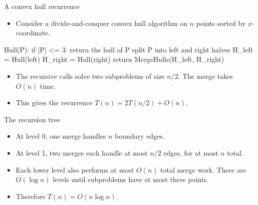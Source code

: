 \documentclass[aspectratio=169]{beamer}
\begin{document}
\begin{frame}[fragile]{A convex hull recurrence}
\begin{itemize}
\item Consider a divide-and-conquer convex hull algorithm on $n$ points sorted by $x$-coordinate.
\end{itemize}
\pause
\begin{pycode}
Hull(P):
    if |P| <= 3: return the hull of P
    split P into left and right halves
    H_left  = Hull(left)
    H_right = Hull(right)
    return MergeHulls(H_left, H_right)
\end{pycode}
\pause
\begin{itemize}[<+->]
\item The recursive calls solve two subproblems of size $n/2$. The merge takes $O(n)$ time.
\item This gives the recurrence $T(n)=2T(n/2)+O(n)$.
\end{itemize}
\end{frame}

\begin{frame}{The recursion tree}
\centering
{}
\begin{itemize}[<+->]
\item At level 0, one merge handles $n$ boundary edges.
\item At level 1, two merges each handle at most $n/2$ edges, for at most $n$ total.
\item Each lower level also performs at most $O(n)$ total merge work. There are $O(\log n)$ levels until subproblems have at most three points.
\item Therefore $T(n)=O(n\log n)$.
\end{itemize}
\end{frame}
\end{document}
